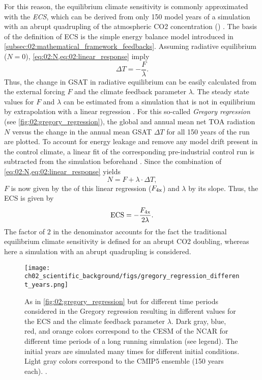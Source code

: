 For this reason, the equilibrium climate sensitivity is commonly approximated
with the \emph{\acf{ECS}}, which can be derived from only 150 model years of a
simulation with an abrupt quadrupling of the atmospheric \ac{CO2} concentration
() \autocite{Gregory2004}. The basis of the definition of \ac{ECS}
is the simple energy balance model introduced in
\cref{subsec:02:mathematical_framework_feedbacks}. Assuming radiative
equilibrium ($N = 0$), \cref{eq:02:N,eq:02:linear_response} imply
\begin{equation}
  \Delta T = -\frac{F}{\lambda}.
  \label{eq:02:delta_t_eq}
\end{equation} Thus, the change in \ac{GSAT} in radiative equilibrium can be
easily calculated from the external forcing $F$ and the climate feedback
parameter $\lambda$. The steady state values for $F$ and $\lambda$ can be
estimated from a  simulation that is not in equilibrium by
extrapolation with a linear regression \autocite{Gregory2004}. For this
so-called \emph{Gregory regression} (see \cref{fig:02:gregory_regression}), the
global and annual mean net \ac{TOA} radiation $N$ versus the change in the
annual mean \ac{GSAT} $\Delta T$ for all 150 years of the  run are
plotted. To account for energy leakage and remove any model drift present in
the control climate, a linear fit of the corresponding pre-industrial control
run is subtracted from the  simulation beforehand
\autocite{Andrews2012}. Since the combination of
\cref{eq:02:N,eq:02:linear_response} yields
\begin{equation}
  N = F + \lambda \cdot \Delta T,
  \label{eq:02:N_vs_delta_t}
\end{equation}
$F$ is now given by the \yintercept{} of this linear regression
($F_{\textnormal{4x}}$) and $\lambda$ by its slope. Thus, the \ac{ECS} is given by
\begin{equation}
  \textnormal{ECS} = -\frac{F_{\textnormal{4x}}}{2 \lambda}.
  \label{eq:02:ecs}
\end{equation}
The factor of $2$ in the denominator accounts for the fact the traditional
equilibrium climate sensitivity is defined for an abrupt \ac{CO2} doubling,
whereas here a simulation with an abrupt quadrupling is considered.

\begin{figure}[t]
  \centering
  \texttt{[image: 
    ch02\_scientific\_background/figs/gregory\_regression\_different\_years.png]}
  \caption[
  Gregory regression for different time periods.
  ]{
    As in \cref{fig:02:gregory_regression} but for different time periods
    considered in the Gregory regression resulting in different values for the
    \acf{ECS} and the climate feedback parameter $\lambda$. Dark gray, blue,
    red, and orange colors correspond to the \acf{CESM} of the \acf{NCAR} for
    different time periods of a long running simulation (see legend). The
    initial years are simulated many times for different initial conditions.
    Light gray colors correspond to the \acs{CMIP}5 ensemble (150 years each).
    .
  }
  \label{fig:02:gregory_regression_different_years}
\end{figure}

